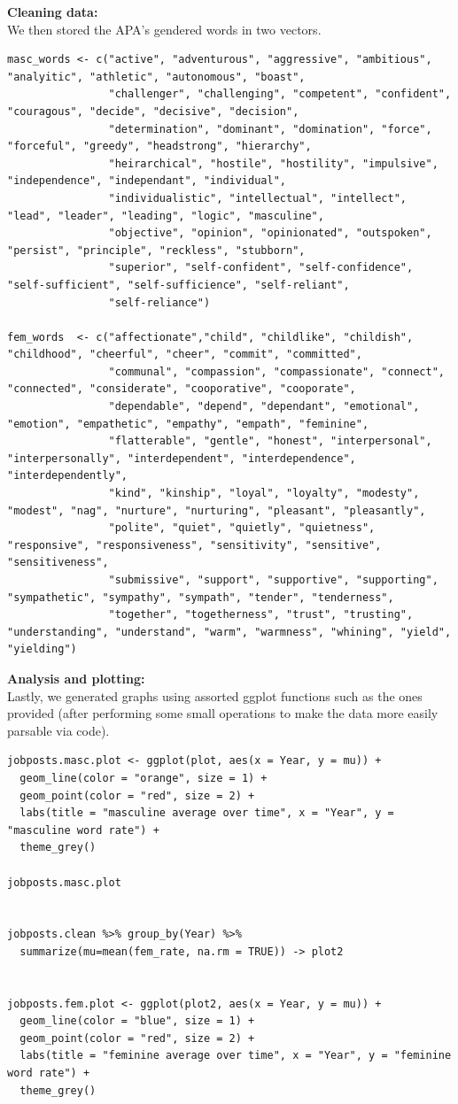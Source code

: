 \documentclass[16pt]{article}
\begin{document}
\noindent \large \textbf{Cleaning data:} \\
\indent We then stored the APA's gendered words in two vectors.
\tiny
\begin{verbatim}
masc_words <- c("active", "adventurous", "aggressive", "ambitious", "analyitic", "athletic", "autonomous", "boast",
                "challenger", "challenging", "competent", "confident", "couragous", "decide", "decisive", "decision",
                "determination", "dominant", "domination", "force", "forceful", "greedy", "headstrong", "hierarchy",
                "heirarchical", "hostile", "hostility", "impulsive", "independence", "independant", "individual",
                "individualistic", "intellectual", "intellect", "lead", "leader", "leading", "logic", "masculine",
                "objective", "opinion", "opinionated", "outspoken", "persist", "principle", "reckless", "stubborn",
                "superior", "self-confident", "self-confidence", "self-sufficient", "self-sufficience", "self-reliant",
                "self-reliance")

fem_words  <- c("affectionate","child", "childlike", "childish", "childhood", "cheerful", "cheer", "commit", "committed",
                "communal", "compassion", "compassionate", "connect", "connected", "considerate", "cooporative", "cooporate",
                "dependable", "depend", "dependant", "emotional", "emotion", "empathetic", "empathy", "empath", "feminine",
                "flatterable", "gentle", "honest", "interpersonal", "interpersonally", "interdependent", "interdependence", "interdependently",
                "kind", "kinship", "loyal", "loyalty", "modesty", "modest", "nag", "nurture", "nurturing", "pleasant", "pleasantly",
                "polite", "quiet", "quietly", "quietness", "responsive", "responsiveness", "sensitivity", "sensitive", "sensitiveness",
                "submissive", "support", "supportive", "supporting", "sympathetic", "sympathy", "sympath", "tender", "tenderness",
                "together", "togetherness", "trust", "trusting", "understanding", "understand", "warm", "warmness", "whining", "yield", "yielding")
\end{verbatim}

\noindent \large \textbf{Analysis and plotting:} \\
\indent Lastly, we generated graphs using assorted ggplot functions such as the ones provided (after performing some small operations to make the data
more easily parsable via code).
\tiny
\begin{verbatim}
jobposts.masc.plot <- ggplot(plot, aes(x = Year, y = mu)) +
  geom_line(color = "orange", size = 1) +
  geom_point(color = "red", size = 2) +
  labs(title = "masculine average over time", x = "Year", y = "masculine word rate") +
  theme_grey()

jobposts.masc.plot


jobposts.clean %>% group_by(Year) %>%
  summarize(mu=mean(fem_rate, na.rm = TRUE)) -> plot2


jobposts.fem.plot <- ggplot(plot2, aes(x = Year, y = mu)) +
  geom_line(color = "blue", size = 1) +
  geom_point(color = "red", size = 2) +
  labs(title = "feminine average over time", x = "Year", y = "feminine word rate") +
  theme_grey()
\end{verbatim}
\end{document}
